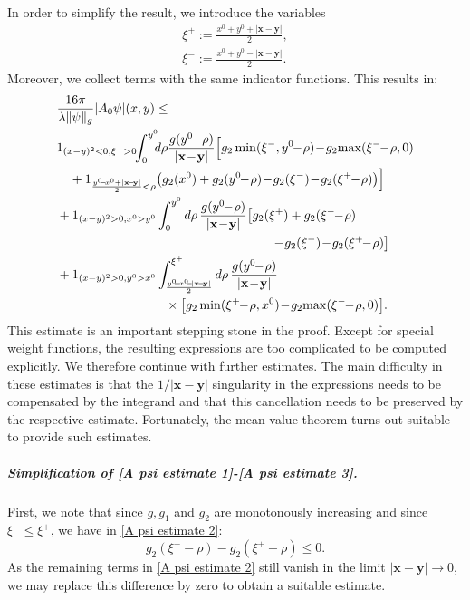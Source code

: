 \documentclass[b5paper,draft,openbib,12pt]{memoir}
\newcommand{\vx}{\mathbf{x}}
\newcommand{\vy}{\mathbf{y}}
\begin{document}
In order to simplify the result, we introduce the 
variables
\begin{align}
    \xi^+:=\frac{x^0+y^0+|\vx-\vy|}{2},\\
    \xi^-:=\frac{x^0+y^0-|\vx-\vy|}{2}.
\end{align}
Moreover, we collect terms with the same indicator 
functions. This results in:
\begin{align}
    &\frac{16\pi}{\lambda\|\psi\|_g}|A_0\psi|(x,y)\le\notag\\
    &1_{(x-y)^2<0,\xi^->0} \!\!\int_0^{y^0}\!\!\!d\rho  \frac{g(y^0\!\!-\!\rho)}{|\vx\!-\!\vy|}
    \Big[g_2\min(\xi^-,y^0\!\!-\!\rho)\!-\!g_2\!\max(\xi^-\!\!-\!\rho,0)
    \notag\\\label{A psi estimate 1}
    &\quad + 1_{\frac{y^0\!\!-\!x^0+|\vx\!-\!\vy|}{2}<\rho} \big(g_2(x^0)+g_2(y^0\!\!-\!\rho)
    \!-\!g_2(\xi^-)\!-\!g_2(\xi^+\!\!-\!\rho)\big)
    \Big]\\\label{A psi estimate 2}
    &+1_{(x-y)^2>0,x^0>y^0}\int_0^{y^0} d\rho \, \frac{g(y^0\!\!-\!\rho)}{|\vx\!-\!\vy|} \big[g_2(\xi^+)+g_2(\xi^-\!\!-\!\rho)\notag\\
    &\hspace{6cm} \!-\! g_2(\xi^-)\!-\!g_2(\xi^+\!\!-\!\rho)\big]\\\label{A psi estimate 3}
    &+1_{(x-y)^2>0,y^0>x^0}\int_{\frac{y^0\!\!-\!x^0\!\!-\!|\vx\!-\!\vy|}{2}}^{\xi^+}d\rho \, \frac{g(y^0\!\!-\!\rho)}{|\vx\!-\!\vy|}\notag\\
    &\hspace{3cm}\times \big[g_2\min(\xi^+\!\!-\!\rho,x^0) \!-\! g_2\!\max(\xi^-\!\!-\!\rho,0)\big].
\end{align}
This estimate is an important stepping stone in the proof. Except for special weight functions, the resulting expressions are too complicated to be computed explicitly. We therefore continue with further estimates. The main difficulty in these estimates is that the $1/|\vx-\vy|$ singularity in the expressions needs to be compensated by the integrand and that this cancellation needs to be preserved by the respective estimate. Fortunately, the mean value theorem turns out suitable to provide such estimates.


\subparagraph{Simplification of 
\eqref{A psi estimate 1}-\eqref{A psi estimate 3}.}
First, we note that since $g, g_1$ and $g_2$ are monotonously increasing and 
since $\xi^- \leq \xi^+$, we have in \eqref{A psi estimate 2}:
\begin{equation}
	g_2(\xi^- - \rho) - g_2(\xi^+ - \rho) \leq 0.
\end{equation}
As the remaining terms in \eqref{A psi estimate 2} still vanish in the limit 
$|\vx-\vy| \rightarrow 0$, we may replace this difference by zero to obtain a 
suitable estimate.
\end{document}
